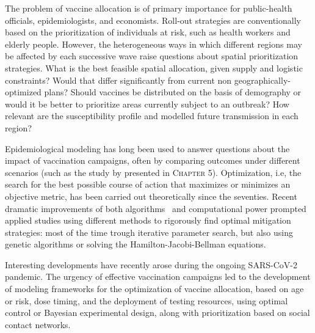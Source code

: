 The problem of vaccine allocation is of primary importance for  public-health officials, epidemiologists, and economists\cite{Emanuel:EthicalFrameworkGlobal:2020, Lipsitch:UnderstandingCOVID19Vaccine:2020}. 
Roll-out strategies are conventionally based on the prioritization of individuals at risk, such as health workers and elderly people\cite{Bubar:ModelinformedCOVID19Vaccine:2021,Fitzpatrick:OptimizingAgespecificVaccination:2021,Baden:EfficacySafetyMRNA1273:2020,Yang:WhoShouldBe:2021}. However, the heterogeneous ways in which different regions may be affected by each successive wave raise questions about spatial prioritization strategies. What is the best feasible spatial allocation, given supply and logistic constraints? Would that differ significantly from current non geographically-optimized plans? Should vaccines be distributed on the basis of demography or would it be better to prioritize areas currently subject to an outbreak? How relevant are the susceptibility profile and modelled future transmission in each region? 

Epidemiological modeling has long been used to answer questions about the impact of vaccination campaigns, often by comparing outcomes under different scenarios (such as the study by \textcite{Lee:AchievingCoordinatedNational:2020} presented in \textsc{Chapter 5}). Optimization, i.e, the search for the best possible course of action that maximizes or minimizes an objective metric, has been carried out theoretically since the seventies\cite{Morton:OptimalControlDeterministic:1974,Sethi:OptimalControlSimple:1978, Greenhalgh:ResultsOptimalControl:1988}. Recent dramatic improvements of both algorithms~\cite{Quirynen:MultipleShootingMicrosecond:2015} and computational power prompted applied studies using different methods to rigorously find optimal mitigation strategies: most of the time trough iterative parameter search\cite{Sah:OptimizingImpactLowefficacy:2018, Medlock:OptimizingInfluenzaVaccine:2009}, but also using genetic algorithms\cite{Patel:FindingOptimalVaccination:2005} or solving the Hamilton-Jacobi-Bellman equations\cite{Zakary:AnalysisMultiregionsDiscrete:2017, MillerNeilan:OptimalVaccineDistribution:2011}.

Interesting developments have recently arose during the ongoing SARS-CoV-2 pandemic\cite{Fitzpatrick:OptimizingAgespecificVaccination:2021, Thul:StochasticOptimizationVaccine:2021,Moore:VaccinationNonPharmaceuticalInterventions:2021}. The urgency of effective vaccination campaigns led to the development of modeling frameworks for the optimization of vaccine allocation, based on age or risk\cite{Matrajt:VaccineOptimizationCOVID19:2020a,Spassiani:VaccinationCriteriaBased:2020,Fitzpatrick:OptimizingAgespecificVaccination:2021, Bubar:ModelinformedCOVID19Vaccine:2021}, dose timing\cite{Saad-Roy:EpidemiologicalEvolutionaryConsiderations:2021, Kadire:DelayedSecondDose:2021}, and the deployment of testing resources, using optimal control\cite{Acemoglu:OptimalAdaptiveTesting:2021} or Bayesian experimental design\cite{Chatzimanolakis:OptimalAllocationLimited:2020}, along with prioritization based on social contact networks\cite{Chen:PrioritizingAllocationCOVID19:2021}. 

